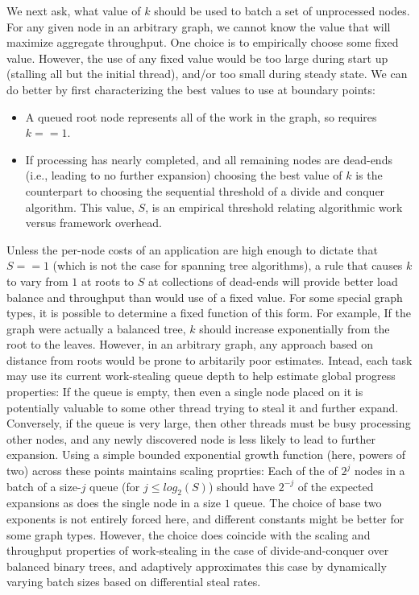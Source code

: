 We next ask, what value of $k$ should be used to batch a set of
unprocessed nodes. For any given node in an arbitrary graph, we cannot
know the value that will maximize aggregate throughput.
One choice is to empirically choose some fixed value. However,
the use of any fixed value would be too large during start up
(stalling all but the initial thread), and/or too small during
steady state. We can do better by first characterizing the
best values to use at boundary points:
\begin{itemize}
  \item A queued root node represents all of the work in the graph, so
    requires $k == 1$.
  \item If processing has nearly completed, and all remaining nodes are
    dead-ends (i.e., leading to no further expansion) choosing the
    best value of $k$ is the counterpart to choosing the sequential
    threshold of a divide and conquer algorithm.  This value, $S$, is an
    empirical threshold relating algorithmic work versus framework
    overhead.  
\end{itemize}

Unless the per-node costs of an application are high enough to dictate
that $S==1$ (which is not the case for spanning tree algorithms), a rule
that causes $k$ to vary from $1$ at roots to $S$ at collections of dead-ends
will provide better load balance and throughput than would use of a
fixed value. For some special graph types, it is possible to determine
a fixed function of this form. For example, If the graph were actually
a balanced tree, $k$ should increase exponentially from the root to the
leaves. However, in an arbitrary graph, any approach based on distance
from roots would be prone to arbitarily poor estimates.  Intead, each
task may use its current work-stealing queue depth to help estimate
global progress properties: If the queue is empty, then even a single
node placed on it is potentially valuable to some other thread trying
to steal it and further expand.  Conversely, if the queue is very
large, then other threads must be busy processing other nodes, and any
newly discovered node is less likely to lead to further expansion.
Using a simple bounded exponential growth function (here, powers of
two) across these points maintains scaling proprties: Each of the of
$2^j$ nodes in a batch of a size-$j$ queue (for $j \leq log_2(S)$) should have
$2^{-j}$ of the expected expansions as does the single node in a size $1$
queue. The choice of base two exponents is not entirely forced here,
and different constants might be better for some graph types.
However, the choice does coincide with the scaling and throughput
properties of work-stealing in the case of divide-and-conquer over
balanced binary trees, and adaptively approximates this case by
dynamically varying batch sizes based on differential steal rates.

